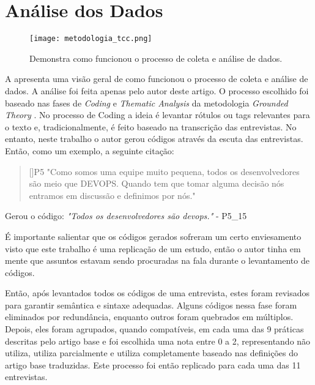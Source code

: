 \section{Análise dos Dados}

\begin{figure}[ht]
\begin{center}
\texttt{[image: metodologia\_tcc.png]}
\end{center}
\caption[Fluxograma da Metodologia]{
    Demonstra como funcionou o processo de coleta e análise de dados.
}\label{fluxograma_metodologia}
\end{figure}

    
A  apresenta uma visão geral de como funcionou o processo de coleta e análise de dados. A análise foi feita apenas pelo autor deste artigo. O processo escolhido foi baseado nas fases de \emph{Coding} e \emph{Thematic Analysis} da metodologia \emph{Grounded Theory} \cite{groundedTheory}. No processo de Coding a ideia é levantar rótulos ou tags relevantes para o texto e, tradicionalmente, é feito baseado na transcrição das entrevistas. No entanto, neste trabalho o autor gerou códigos através da escuta das entrevistas. Então, como um exemplo, a seguinte citação:

\begin{quotation}[]{P5}
"Como somos uma equipe muito pequena, todos os desenvolvedores são meio que DEVOPS. Quando tem que tomar alguma decisão nós entramos em discussão e definimos por nós."
\end{quotation}

Gerou o código: \emph{"Todos os desenvolvedores são devops."} - P5\_15

É importante salientar que os códigos gerados sofreram um certo enviesamento visto que este trabalho é uma replicação de um estudo, então o autor tinha em mente que assuntos estavam sendo procuradas na fala durante o levantamento de códigos. 

Então, após levantados todos os códigos de uma entrevista, estes foram revisados para garantir semântica e sintaxe adequadas. Alguns códigos nessa fase foram eliminados por redundância, enquanto outros foram quebrados em múltiplos. Depois, eles foram agrupados, quando compatíveis, em cada uma das 9 práticas descritas pelo artigo base e foi escolhida uma nota entre 0 a 2, representando não utiliza, utiliza parcialmente e utiliza completamente baseado nas definições do artigo base traduzidas. Este processo foi então replicado para cada uma das 11 entrevistas.

